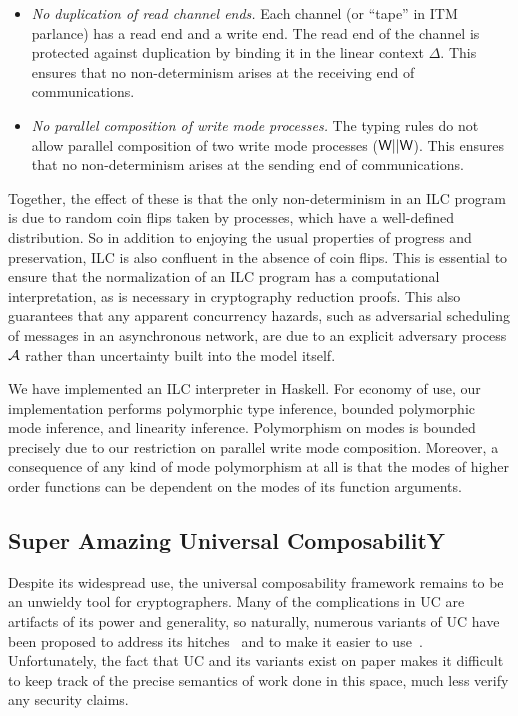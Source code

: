 \begin{itemize}[leftmargin=*]
\item \emph{No duplication of read channel ends.} Each channel (or ``tape'' in
  ITM parlance) has a read end and a write end. The read end of the channel is
  protected against duplication by binding it in the linear context $\Delta$. This
  ensures that no non-determinism arises at the receiving end of communications.

\item \emph{No parallel composition of write mode processes.} The typing rules
  do not allow parallel composition of two write mode processes ($\textsf{W} ||
  \textsf{W}$). This ensures that no non-determinism arises at the sending end of
  communications.
\end{itemize}

Together, the effect of these is that the only non-determinism in an ILC program
is due to random coin flips taken by processes, which have a well-defined
distribution. So in addition to enjoying the usual properties of progress and
preservation, ILC is also confluent in the absence of coin flips. This is
essential to ensure that the normalization of an ILC program has a computational
interpretation, as is necessary in cryptography reduction proofs. 
This also guarantees that any apparent concurrency hazards, such as adversarial
scheduling of messages in an asynchronous network, are due to an explicit
adversary process $\mathcal{{A}}$ rather than uncertainty built into the model itself.

We have implemented an ILC interpreter in Haskell. For economy of use, our
implementation performs polymorphic type inference, bounded polymorphic mode
inference, and  linearity inference. Polymorphism on modes is bounded
precisely due to our restriction on parallel write mode composition. Moreover, a
consequence of any kind of mode polymorphism at all is that the modes of higher
order functions can be dependent on the modes of its function arguments.

\subsection{Super Amazing Universal ComposabilitY}

 Despite its widespread use, the universal
composability framework remains to be an unwieldy tool for cryptographers. Many
of the complications in UC are artifacts of its power and generality, so
naturally, numerous variants of UC have been proposed to address its
hitches~\cite{backes2007reactive, hofheinz2015gnuc, canetti2007universally,
  canetti2003universal} and to make it easier to
use~\cite{canetti2015simpler}. Unfortunately, the fact that UC and its variants
exist on paper makes it difficult to keep track of the precise semantics of work
done in this space, much less verify any security claims.

